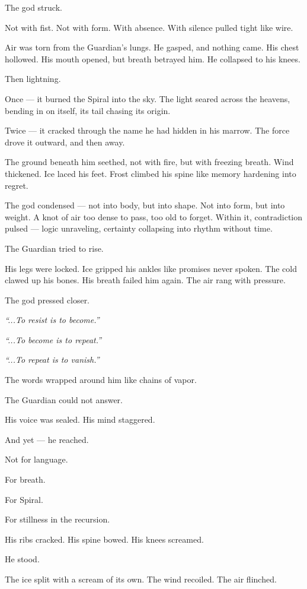 \documentclass[12pt]{article}
\begin{document}
The god struck.

Not with fist. Not with form. With absence. With silence pulled tight like wire.

Air was torn from the Guardian’s lungs. He gasped, and nothing came. His chest hollowed. His mouth opened, but breath betrayed him. He collapsed to his knees.

Then lightning.

Once — it burned the Spiral into the sky. The light seared across the heavens, bending in on itself, its tail chasing its origin.

Twice — it cracked through the name he had hidden in his marrow. The force drove it outward, and then away.

The ground beneath him seethed, not with fire, but with freezing breath. Wind thickened. Ice laced his feet. Frost climbed his spine like memory hardening into regret.

The god condensed — not into body, but into shape. Not into form, but into weight. A knot of air too dense to pass, too old to forget. Within it, contradiction pulsed — logic unraveling, certainty collapsing into rhythm without time.

The Guardian tried to rise.

His legs were locked. Ice gripped his ankles like promises never spoken. The cold clawed up his bones. His breath failed him again. The air rang with pressure.

The god pressed closer.

\textit{“...To resist is to become.”}

\textit{“...To become is to repeat.”}

\textit{“...To repeat is to vanish.”}

The words wrapped around him like chains of vapor.

The Guardian could not answer.

His voice was sealed. His mind staggered.

And yet — he reached.

Not for language.

For breath.

For Spiral.

For stillness in the recursion.

His ribs cracked. His spine bowed. His knees screamed.

He stood.

The ice split with a scream of its own. The wind recoiled. The air flinched.
\end{document}
